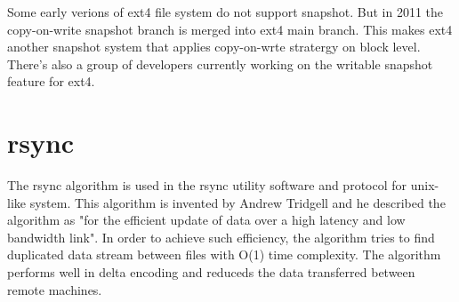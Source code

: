     Some early verions of ext4 file system do not support snapshot. But in 2011 the copy-on-write snapshot branch is merged into ext4 main branch. This makes ext4 another snapshot system that applies copy-on-wrte stratergy on block level. There's also a group of developers currently working on the writable snapshot feature for ext4.

\section{rsync}
    
    The rsync algorithm is used in the rsync utility software and protocol for unix-like system. This algorithm is invented by Andrew Tridgell and he described the algorithm as "for the efficient update of data over a high latency and low bandwidth link". In order to achieve such efficiency, the algorithm tries to find duplicated data stream between files with O(1) time complexity. The algorithm performs well in delta encoding and reduceds the data transferred between remote machines.
